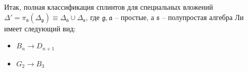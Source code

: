 \documentclass[12pt]{article}
\newcommand{\pia}{\pi_{\mathfrak{a}}}
\newcommand{\gf}{\mathfrak{g}}
\newcommand{\af}{\mathfrak{a}}
\newcommand{\sfr}{\mathfrak{s}}
\begin{document}


Итак, полная классификация сплинтов для специальных вложений $\Delta'=\pia(\Delta_{\gf})
\equiv \Delta_{\af}\cup \Delta_{\sfr}$, где  $\gf, \af$ -- простые, а  $\sfr$ -- полупростая алгебра
Ли имеет следующий вид:
\begin{itemize}
\item $B_{n}\to D_{n+1}$
\item $G_{2}\to B_{3}$
\end{itemize}
\end{document}
